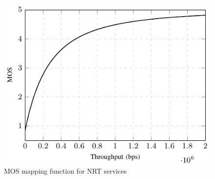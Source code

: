 \documentclass[conference]{IEEEtran}
\newcommand{\SecRef}[1]{Section~\ref{#1}}
\newcommand{\EqRef}[1]{Equation~\ref{#1}}
\newcommand{\AppRef}[1]{Appendix~\ref{#1}}
\begin{document}
\begin{figure}
	\centering
	\includegraphics[width=0.55\linewidth]{figs_wp2/figs_BRUNO_PEDRO/MOSTSMQoE}
	\caption{MOS mapping function for NRT services}
	\label{Fig:MOSTSMQoE}
\end{figure}
%
%
%
%
%
\end{document}
